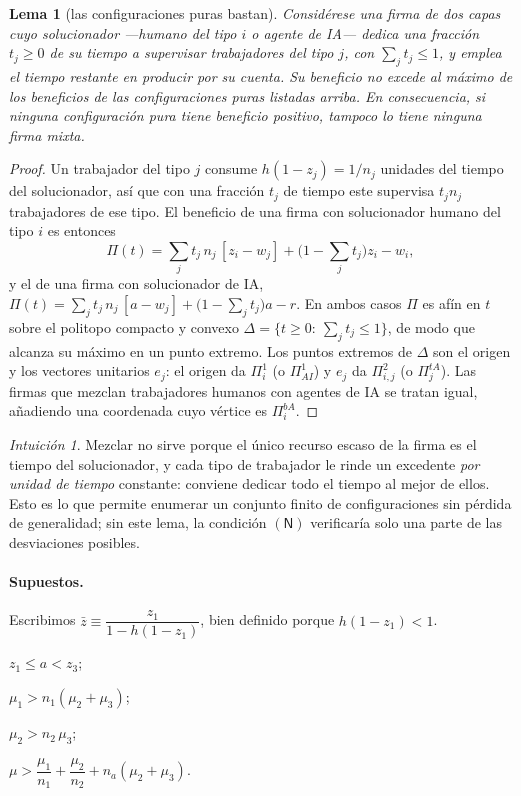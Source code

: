 \documentclass[11pt]{article}
\theoremstyle{plain}
\newtheorem{lema}{Lema}
\theoremstyle{definition}
\theoremstyle{remark}
\newtheorem*{intuicion}{Intuición}
\newcommand{\ai}{a}
\newcommand{\N}{\mathsf{N}}
\begin{document}
\begin{lema}[las configuraciones puras bastan]\label{lem:puras}
Considérese una firma de dos capas cuyo solucionador ---humano del tipo $i$ o agente de IA--- dedica
una fracción $t_j\ge0$ de su tiempo a supervisar trabajadores del tipo $j$, con $\sum_j t_j\le1$, y
emplea el tiempo restante en producir por su cuenta. Su beneficio no excede al máximo de los
beneficios de las configuraciones puras listadas arriba. En consecuencia, si ninguna configuración
pura tiene beneficio positivo, tampoco lo tiene ninguna firma mixta.
\end{lema}
\begin{proof}
Un trabajador del tipo $j$ consume $h(1-z_j)=1/n_j$ unidades del tiempo del solucionador, así que con
una fracción $t_j$ de tiempo este supervisa $t_j n_j$ trabajadores de ese tipo. El beneficio de una
firma con solucionador humano del tipo $i$ es entonces
\[
  \Pi(t)=\sum_j t_j\,n_j\,[z_i-w_j]+\Big(1-\sum_j t_j\Big)z_i-w_i ,
\]
y el de una firma con solucionador de IA,
$\Pi(t)=\sum_j t_j\,n_j\,[\ai-w_j]+\big(1-\sum_j t_j\big)\ai-r$. En ambos casos $\Pi$ es afín en
$t$ sobre el politopo compacto y convexo $\Delta=\{t\ge0:\ \sum_j t_j\le1\}$, de modo que alcanza su
máximo en un punto extremo. Los puntos extremos de $\Delta$ son el origen y los vectores unitarios
$e_j$: el origen da $\Pi^{1}_i$ (o $\Pi^{1}_{AI}$) y $e_j$ da $\Pi^{2}_{i,j}$ (o $\Pi^{tA}_{j}$).
Las firmas que mezclan trabajadores humanos con agentes de IA se tratan igual, añadiendo una
coordenada cuyo vértice es $\Pi^{bA}_{i}$.
\end{proof}

\begin{intuicion}
Mezclar no sirve porque el único recurso escaso de la firma es el tiempo del solucionador, y cada
tipo de trabajador le rinde un excedente \emph{por unidad de tiempo} constante: conviene dedicar todo
el tiempo al mejor de ellos. Esto es lo que permite enumerar un conjunto finito de configuraciones sin
pérdida de generalidad; sin este lema, la condición $(\N)$ verificaría solo una parte de las
desviaciones posibles.
\end{intuicion}

\paragraph{Supuestos.} Escribimos $\bar z\equiv\dfrac{z_1}{1-h(1-z_1)}$, bien definido porque
$h(1-z_1)<1$.
\begin{description}[leftmargin=3em]
  \item[(A0)] $z_1\le \ai<z_3$;
  \item[(A1)] $\mu_1>n_1(\mu_2+\mu_3)$;
  \item[(A2)] $\mu_2>n_2\,\mu_3$;
  \item[(A3)] $\mu>\dfrac{\mu_1}{n_1}+\dfrac{\mu_2}{n_2}+n_a(\mu_2+\mu_3)$.
\end{description}
\end{document}
